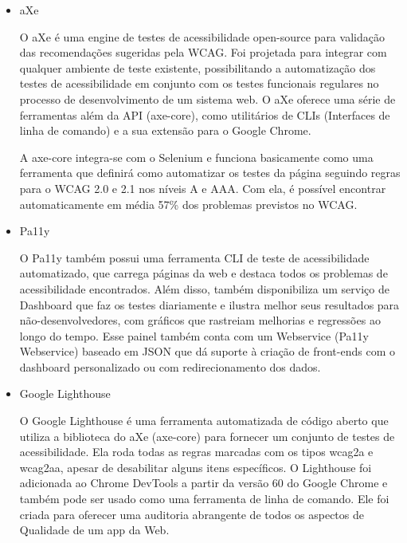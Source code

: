 \documentclass[
	12pt,				%
	openright,			%
	oneside,			%
	a4paper,			%
	chapter=TITLE,		%
	section=TITLE,		%
	subsection=TITLE,	%
	subsubsection=TITLE,%
	english,			%
	brazil				%
	]{abntex2}
\theoremstyle{definition}
\begin{document}
\begin{itemize}

    \item aXe
    
O aXe é uma engine de testes de acessibilidade open-source para validação das recomendações sugeridas pela WCAG. Foi projetada para integrar com qualquer ambiente de teste existente, possibilitando a automatização dos testes de acessibilidade em conjunto com os testes funcionais regulares no processo de desenvolvimento de um sistema web. O aXe oferece uma série de ferramentas além da API (axe-core), como utilitários de CLIs (Interfaces de linha de comando) e a sua extensão para o Google Chrome.

A axe-core integra-se com o Selenium e funciona basicamente como uma ferramenta que definirá como automatizar os testes da página seguindo regras para o WCAG 2.0 e 2.1 nos níveis A e AAA. Com ela, é possível encontrar automaticamente em média 57\% dos problemas previstos no WCAG.
    
    \pagebreak
    
    \item Pa11y
    
O Pa11y também possui uma ferramenta CLI de teste de acessibilidade automatizado, que carrega páginas da web e destaca todos os problemas de acessibilidade encontrados. Além disso, também disponibiliza um serviço de Dashboard que faz os testes diariamente e ilustra melhor seus resultados para não-desenvolvedores, com gráficos que rastreiam melhorias e regressões ao longo do tempo. Esse painel também conta com um Webservice (Pa11y Webservice) baseado em JSON que dá suporte à criação de front-ends com o dashboard personalizado ou com redirecionamento dos dados.

    \item Google Lighthouse
    
O Google Lighthouse é uma ferramenta automatizada de código aberto que utiliza a biblioteca do aXe (axe-core) para fornecer um conjunto de testes de acessibilidade. Ela roda todas as regras marcadas com os tipos wcag2a e wcag2aa, apesar de desabilitar alguns itens específicos. O Lighthouse foi adicionada ao Chrome DevTools a partir da versão 60 do Google Chrome e também pode ser usado como uma ferramenta de linha de comando. Ele foi criada para oferecer uma auditoria abrangente de todos os aspectos de Qualidade de um app da Web.


\end{itemize}
\end{document}
